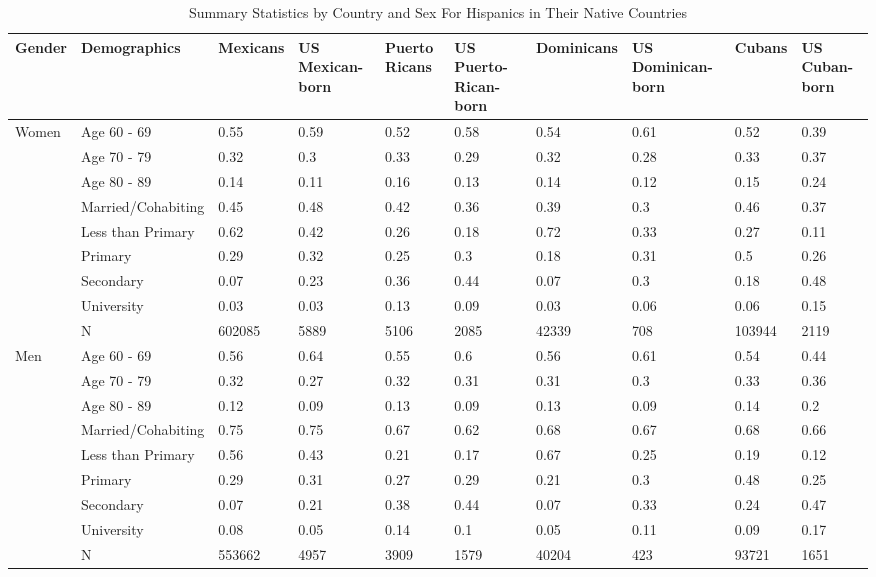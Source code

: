 \begin{table}[ht]
\centering
\caption{Summary Statistics by Country and Sex For Hispanics in Their Native Countries} 
\begin{tabular}{l|l|llllllll}
  \hline
Gender & Demographics & Mexicans & US Mexican-born & Puerto Ricans & US Puerto-Rican-born & Dominicans & US Dominican-born & Cubans & US Cuban-born \\ 
  \hline
Women & Age 60 - 69 & 0.55 & 0.59 & 0.52 & 0.58 & 0.54 & 0.61 & 0.52 & 0.39 \\ 
   & Age 70 - 79 & 0.32 & 0.3 & 0.33 & 0.29 & 0.32 & 0.28 & 0.33 & 0.37 \\ 
   & Age 80 - 89 & 0.14 & 0.11 & 0.16 & 0.13 & 0.14 & 0.12 & 0.15 & 0.24 \\ 
   & Married/Cohabiting & 0.45 & 0.48 & 0.42 & 0.36 & 0.39 & 0.3 & 0.46 & 0.37 \\ 
   & Less than Primary & 0.62 & 0.42 & 0.26 & 0.18 & 0.72 & 0.33 & 0.27 & 0.11 \\ 
   & Primary & 0.29 & 0.32 & 0.25 & 0.3 & 0.18 & 0.31 & 0.5 & 0.26 \\ 
   & Secondary & 0.07 & 0.23 & 0.36 & 0.44 & 0.07 & 0.3 & 0.18 & 0.48 \\ 
   & University & 0.03 & 0.03 & 0.13 & 0.09 & 0.03 & 0.06 & 0.06 & 0.15 \\ 
   & N & 602085 & 5889 & 5106 & 2085 & 42339 & 708 & 103944 & 2119 \\ 
  Men & Age 60 - 69 & 0.56 & 0.64 & 0.55 & 0.6 & 0.56 & 0.61 & 0.54 & 0.44 \\ 
   & Age 70 - 79 & 0.32 & 0.27 & 0.32 & 0.31 & 0.31 & 0.3 & 0.33 & 0.36 \\ 
   & Age 80 - 89 & 0.12 & 0.09 & 0.13 & 0.09 & 0.13 & 0.09 & 0.14 & 0.2 \\ 
   & Married/Cohabiting & 0.75 & 0.75 & 0.67 & 0.62 & 0.68 & 0.67 & 0.68 & 0.66 \\ 
   & Less than Primary & 0.56 & 0.43 & 0.21 & 0.17 & 0.67 & 0.25 & 0.19 & 0.12 \\ 
   & Primary & 0.29 & 0.31 & 0.27 & 0.29 & 0.21 & 0.3 & 0.48 & 0.25 \\ 
   & Secondary & 0.07 & 0.21 & 0.38 & 0.44 & 0.07 & 0.33 & 0.24 & 0.47 \\ 
   & University & 0.08 & 0.05 & 0.14 & 0.1 & 0.05 & 0.11 & 0.09 & 0.17 \\ 
   & N & 553662 & 4957 & 3909 & 1579 & 40204 & 423 & 93721 & 1651 \\ 
   \hline
\end{tabular}
\end{table}
